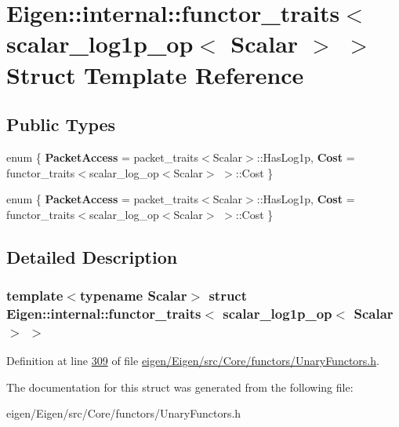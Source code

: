 \hypertarget{struct_eigen_1_1internal_1_1functor__traits_3_01scalar__log1p__op_3_01_scalar_01_4_01_4}{}\section{Eigen\+:\+:internal\+:\+:functor\+\_\+traits$<$ scalar\+\_\+log1p\+\_\+op$<$ Scalar $>$ $>$ Struct Template Reference}
\label{struct_eigen_1_1internal_1_1functor__traits_3_01scalar__log1p__op_3_01_scalar_01_4_01_4}
\subsection*{Public Types}
\begin{DoxyCompactItemize}
\item 
\mbox{\label{struct_eigen_1_1internal_1_1functor__traits_3_01scalar__log1p__op_3_01_scalar_01_4_01_4_aa32f48dd584b54fdfdb177d13205ed67}} 
enum \{ {\bfseries Packet\+Access} = packet\+\_\+traits$<$Scalar$>$\+:\+:Has\+Log1p, 
{\bfseries Cost} = functor\+\_\+traits$<$scalar\+\_\+log\+\_\+op$<$Scalar$>$ $>$\+:\+:Cost
 \}
\item 
\mbox{\label{struct_eigen_1_1internal_1_1functor__traits_3_01scalar__log1p__op_3_01_scalar_01_4_01_4_a2b901a4ab3f5bc988772e663b5620c12}} 
enum \{ {\bfseries Packet\+Access} = packet\+\_\+traits$<$Scalar$>$\+:\+:Has\+Log1p, 
{\bfseries Cost} = functor\+\_\+traits$<$scalar\+\_\+log\+\_\+op$<$Scalar$>$ $>$\+:\+:Cost
 \}
\end{DoxyCompactItemize}


\subsection{Detailed Description}
\subsubsection*{template$<$typename Scalar$>$\newline
struct Eigen\+::internal\+::functor\+\_\+traits$<$ scalar\+\_\+log1p\+\_\+op$<$ Scalar $>$ $>$}



Definition at line \hyperlink{eigen_2_eigen_2src_2_core_2functors_2_unary_functors_8h_source_l00309}{309} of file \hyperlink{eigen_2_eigen_2src_2_core_2functors_2_unary_functors_8h_source}{eigen/\+Eigen/src/\+Core/functors/\+Unary\+Functors.\+h}.



The documentation for this struct was generated from the following file\+:\begin{DoxyCompactItemize}
\item 
eigen/\+Eigen/src/\+Core/functors/\+Unary\+Functors.\+h\end{DoxyCompactItemize}
